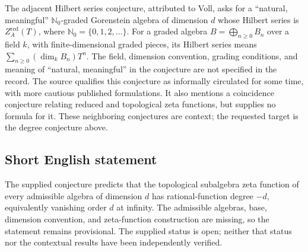 \documentclass[11pt]{article}
\begin{document}
The adjacent Hilbert series conjecture, attributed to Voll, asks for a ``natural, meaningful'' \(\mathbb N_0\)-graded Gorenstein algebra of dimension \(d\) whose Hilbert series is \(Z_A^{\mathrm{red}}(T)\), where \(\mathbb N_0=\{0,1,2,\ldots\}\). For a graded algebra \(B=\bigoplus_{n\geq0}B_n\) over a field \(k\), with finite-dimensional graded pieces, its Hilbert series means \(\sum_{n\geq0}(\dim_k B_n)T^n\). The field, dimension convention, grading conditions, and meaning of ``natural, meaningful'' in the conjecture are not specified in the record. The source qualifies this conjecture as informally circulated for some time, with more cautious published formulations. It also mentions a coincidence conjecture relating reduced and topological zeta functions, but supplies no formula for it. These neighboring conjectures are context; the requested target is the degree conjecture above.
\subsection{Short English statement}
The supplied conjecture predicts that the topological subalgebra zeta function of every admissible algebra of dimension \(d\) has rational-function degree \(-d\), equivalently vanishing order \(d\) at infinity. The admissible algebras, base, dimension convention, and zeta-function construction are missing, so the statement remains provisional. The supplied status is open; neither that status nor the contextual results have been independently verified.
\end{document}

